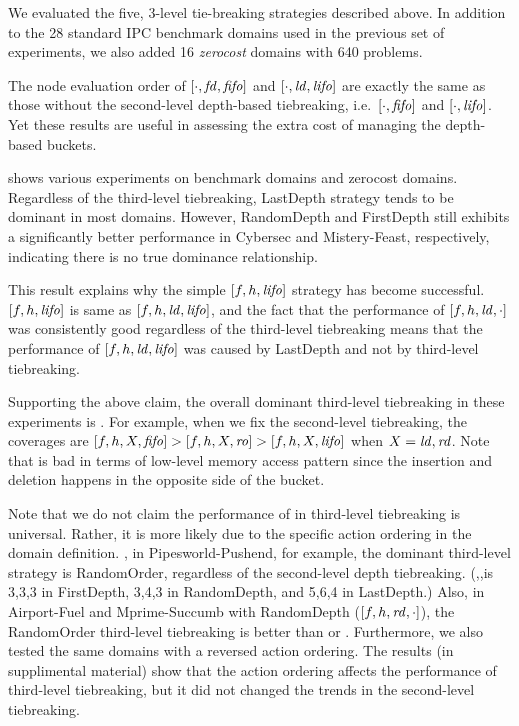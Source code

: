 We evaluated the five, 3-level tie-breaking strategies described above.
% 
In addition to the 28 standard IPC benchmark domains used in the previous set of experiments, we also added 16 \emph{zerocost} domains with 640 problems. 

The node evaluation order of $[\cdot,\mbox{\textit{fd}},\mbox{\textit{fifo}}]$ and $[\cdot,\mbox{\textit{ld}},\mbox{\textit{lifo}}]$
are exactly the same as those without the second-level
depth-based tiebreaking, i.e.\ $[\cdot,\mbox{\textit{fifo}}]$ and $[\cdot,\mbox{\textit{lifo}}]$.
Yet these results are useful in assessing the extra cost of managing the
depth-based buckets.

 shows various experiments on benchmark domains and
zerocost domains. Regardless of the third-level tiebreaking, LastDepth
strategy tends to be dominant in most domains. However, RandomDepth and
FirstDepth still exhibits a significantly better performance in Cybersec
and Mistery-Feast, respectively, indicating there is no true dominance relationship.

This result explains why the simple $[f,h,\mbox{\textit{lifo}}]$ strategy has become
successful. $[f,h,\mbox{\textit{lifo}}]$ is same as $[f,h,\mbox{\textit{ld}},\mbox{\textit{lifo}}]$, and the fact
that the performance of $[f,h,\mbox{\textit{ld}},\cdot]$ was consistently good
regardless of the third-level tiebreaking means that the performance of
$[f,h,\mbox{\textit{ld}},\mbox{\textit{lifo}}]$ was caused by LastDepth and not by third-level \lifo tiebreaking.

Supporting the above claim, the overall dominant third-level tiebreaking
in these experiments is \fifo.  For example, when we fix the second-level
tiebreaking, the coverages are $[f,h,X,\mbox{\textit{fifo}}]>[f,h,X,\mbox{\textit{ro}}]>[f,h,X,\mbox{\textit{lifo}}]$
when $X=\mbox{\textit{ld}},\mbox{\textit{rd}}$.  Note that \fifo is bad in terms of low-level memory
access pattern since the insertion and deletion happens in the opposite
side of the bucket. 

Note that we do not claim the performance of \fifo in third-level
tiebreaking is universal.  Rather, it is more likely due to the specific
action ordering in the domain definition. , in Pipesworld-Pushend,
for example, the dominant third-level strategy is RandomOrder,
regardless of the second-level depth tiebreaking.  (\fifo,\ro,\lifo is
3,3,3 in FirstDepth, 3,4,3 in RandomDepth, and 5,6,4 in LastDepth.)
Also, in Airport-Fuel and Mprime-Succumb with RandomDepth ($[f,h,\mbox{\textit{rd}},\cdot]$), 
the RandomOrder third-level tiebreaking is better than \lifo or \fifo.
Furthermore, we also tested the same domains with a reversed
action ordering. The results (in supplimental
material) show that the action ordering affects the performance of
third-level tiebreaking, but it did not changed the trends in the
second-level tiebreaking.

